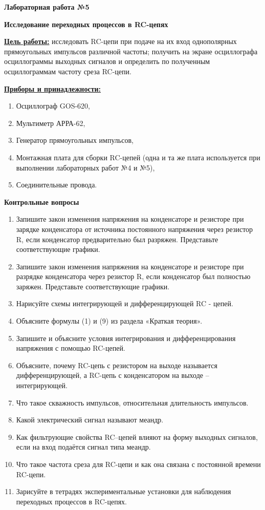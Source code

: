 \documentclass[14pt,a4paper]{article}
\begin{document}
\begin{center}
  \textbf{\large Лабораторная работа №5} \vspace{1cm}

  \textbf{\Large Исследование переходных процессов в RC-цепях}
\end{center}
  
\textbf{\underline{Цель работы:}} исследовать RC-цепи при подаче на их вход однополярных прямоугольных импульсов различной частоты; получить на экране осциллографа осциллограммы выходных сигналов и определить по полученным осциллограммам частоту среза RC-цепи.

\textbf{\underline{Приборы и принадлежности:}}

\begin{enumerate}
\def\labelenumi{\arabic{enumi}.}
\item Осциллограф GOS-620,
\item Мультиметр АРРА-62,
\item Генератор прямоугольных импульсов,
\item Монтажная плата для сборки RC-цепей (одна и та же плата используется при выполнении лабораторных работ №4 и №5),
\item Соединительные провода.
\end{enumerate}

\textbf{Контрольные вопросы}

\begin{enumerate}
\def\labelenumi{\arabic{enumi}.}
\item Запишите закон изменения напряжения на конденсаторе и резисторе при
  зарядке конденсатора от источника постоянного напряжения через
  резистор R, если конденсатор предварительно был разряжен. Представьте
  соответствующие графики.
\item Запишите закон изменения напряжения на конденсаторе и резисторе при разрядке конденсатора через резистор R, если конденсатор был полностью
  заряжен. Представьте соответствующие графики.
\item
  Нарисуйте схемы интегрирующей и дифференцирующей RC - цепей.
\item
  Объясните формулы (1) и (9) из раздела «Краткая теория».
\item
  Запишите и объясните условия интегрирования и дифференцирования
  напряжения с помощью RC-цепей.
\item
  Объясните, почему RC-цепь с резистором на выходе называется
  дифференцирующей, а RC-цепь с конденсатором на выходе --  интегрирующей.
\item
  Что такое скважность импульсов, относительная длительность импульсов.
\item
  Какой электрический сигнал называют меандр.
\item
  Как фильтрующие свойства RC--цепей влияют на форму выходных сигналов,
  если на вход подаётся сигнал типа меандр.
\item
  Что такое частота среза для RC-цепи и как она связана с постоянной
  времени RC-цепи.
\item
  Зарисуйте в тетрадях экспериментальные установки для наблюдения
  переходных процессов в RC-цепях.
\end{enumerate}
\end{document}
